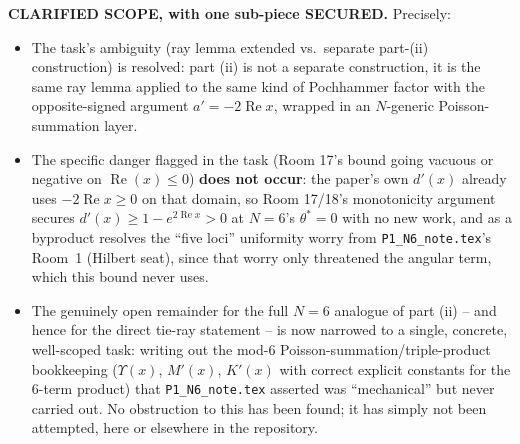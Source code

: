 \documentclass[11pt]{article}
\begin{document}
\textbf{CLARIFIED SCOPE, with one sub-piece SECURED.} Precisely:
\begin{itemize}
\item The task's ambiguity (ray lemma extended vs.\ separate part-(ii) construction) is resolved:
part (ii) is not a separate construction, it is the same ray lemma applied to the same kind of
Pochhammer factor with the opposite-signed argument $a'=-2\operatorname{Re}x$, wrapped in an
$N$-generic Poisson-summation layer.
\item The specific danger flagged in the task (Room 17's bound going vacuous or negative on
$\operatorname{Re}(x)\le0$) \textbf{does not occur}: the paper's own $d'(x)$ already uses
$-2\operatorname{Re}x\ge0$ on that domain, so Room 17/18's monotonicity argument secures
$d'(x)\ge1-e^{2\operatorname{Re}x}>0$ at $N=6$'s $\theta^\ast=0$ with no new work, and as a
byproduct resolves the ``five loci'' uniformity worry from \texttt{P1\_N6\_note.tex}'s Room~1
(Hilbert seat), since that worry only threatened the angular term, which this bound never uses.
\item The genuinely open remainder for the full $N=6$ analogue of part (ii) -- and hence for the
direct tie-ray statement -- is now narrowed to a single, concrete, well-scoped task: writing out
the mod-$6$ Poisson-summation/triple-product bookkeeping ($\Upsilon(x)$, $M'(x)$, $K'(x)$ with
correct explicit constants for the $6$-term product) that \texttt{P1\_N6\_note.tex} asserted was
``mechanical'' but never carried out. No obstruction to this has been found; it has simply not
been attempted, here or elsewhere in the repository.
\end{itemize}
\end{document}
